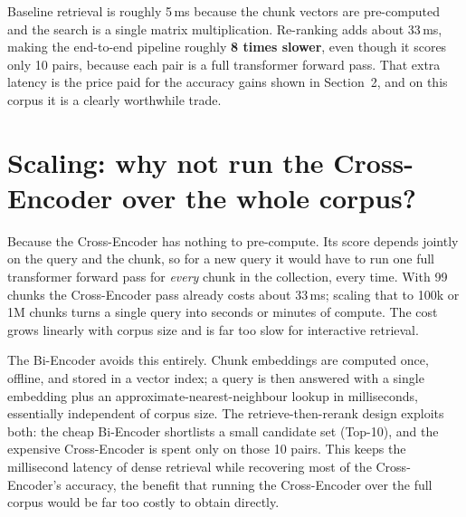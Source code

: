 \documentclass[11pt]{article}
\begin{document}
\noindent Baseline retrieval is roughly 5\,ms because the chunk vectors are pre-computed and the
search is a single matrix multiplication. Re-ranking adds about 33\,ms, making the end-to-end
pipeline roughly \textbf{8 times slower}, even though it scores only 10 pairs, because each pair is a
full transformer forward pass. That extra latency is the price paid for the accuracy gains shown in
Section~2, and on this corpus it is a clearly worthwhile trade.

\section{Scaling: why not run the Cross-Encoder over the whole corpus?}
Because the Cross-Encoder has nothing to pre-compute. Its score depends jointly on the query and the
chunk, so for a new query it would have to run one full transformer forward pass for \emph{every}
chunk in the collection, every time. With 99 chunks the Cross-Encoder pass already costs about
33\,ms; scaling that to 100k or 1M chunks turns a single query into seconds or minutes of compute.
The cost grows linearly with corpus size and is far too slow for interactive retrieval.

The Bi-Encoder avoids this entirely. Chunk embeddings are computed once, offline, and stored in a
vector index; a query is then answered with a single embedding plus an approximate-nearest-neighbour
lookup in milliseconds, essentially independent of corpus size. The retrieve-then-rerank design
exploits both: the cheap Bi-Encoder shortlists a small candidate set (Top-10), and the expensive
Cross-Encoder is spent only on those 10 pairs. This keeps the millisecond latency of dense retrieval
while recovering most of the Cross-Encoder's accuracy, the benefit that running the Cross-Encoder over
the full corpus would be far too costly to obtain directly.
\end{document}
